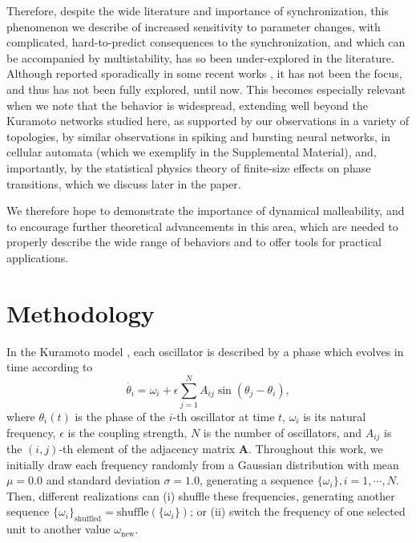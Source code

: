 Therefore, despite the wide literature and importance of synchronization, this phenomenon we describe of increased sensitivity to parameter changes, with complicated, hard-to-predict consequences to the synchronization, and which can be accompanied by multistability, has so been under-explored in the literature. Although reported sporadically in some recent works \cite{peter2018transition, taylor2016synchronization, fernandez2022emergence, budzinski2019synchronous}, it has not been the focus, and thus has not been fully explored, until now. This becomes especially relevant when we note that the behavior is widespread, extending well beyond the Kuramoto networks studied here, as supported by our observations in a variety of topologies, by similar observations in spiking \cite{budzinski2020synchronization} and bursting \cite{budzinski2019synchronous} neural networks, in cellular automata (which we exemplify in the Supplemental Material), and, importantly, by the statistical physics theory of finite-size effects on phase transitions, which we discuss later in the paper. 

We therefore hope to demonstrate the importance of dynamical malleability, and to encourage further theoretical advancements in this area, which are needed to properly describe the wide range of behaviors and to offer tools for practical applications.  

\section{Methodology}\label{sec:methodology}

In the Kuramoto model \cite{kuramoto1975self, kuramoto1984chemical}, each oscillator is described by a phase which evolves in time according to
%
\begin{equation}
    \Dot{\theta_{i}} = \omega_{i} + \epsilon \sum\limits_{j=1}^{N} A_{ij} \sin{(\theta_{j} - \theta_{i})},
    \label{eq:main_kuramoto}
\end{equation}
%
where $\theta_{i}(t)$ is the phase of the $i$-th oscillator at time $t$, $\omega_{i}$ is its natural frequency, $\epsilon$ is the coupling strength, $N$ is the number of oscillators, and $A_{ij}$ is the $(i,j)$-th element of the adjacency matrix $\mathbf{A}$. Throughout this work, we initially draw each frequency randomly from a Gaussian distribution with mean $\mu = 0.0$ and standard deviation $\sigma = 1.0$, generating a sequence $\{\omega_{i}\}, i=1,\cdots,N$. Then, different realizations can (i) shuffle these frequencies, generating another sequence $\{\omega_{i}\}_{\mathrm{shuffled}} = \mathrm{shuffle}(\{\omega_{i}\})$; or (ii) switch the frequency of one selected unit to another value $\omega_{\mathrm{new}}$. 

